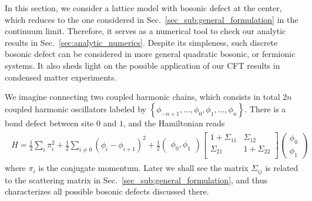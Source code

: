 In this section, we consider a lattice model with bosonic defect at the center, which reduces to the one considered in Sec.~\ref{sec_sub:general_formulation} in the continuum limit\cite{calabrese_entanglement_2012}. Therefore, it serves as a numerical tool to check our analytic results in Sec.~\ref{sec:analytic_numerics}. Despite its simpleness, such discrete bosonic defect can be considered in more general quadratic bosonic\cite{PhysRevA.74.022329}, or fermionic\cite{PhysRevB.64.064412} systems. It also sheds light on the possible application of our CFT results in condensed matter experiments\cite{Rohringer2015,Trotzky2012}.


We imagine connecting two coupled harmonic chains, which consists in total $2n$ coupled harmonic oscillators labeled by $\left\{\phi_{-n+1},...,\phi_0,\phi_1,...,\phi_n\right\}$. There is a bond defect between site $0$ and $1$, and the Hamiltonian reads
\begin{eqnarray}\begin{aligned}
H = \frac{1}{2} \sum_i \pi_i^2  +  \frac{1}{2} \sum_{i\ne 0 }  ( \phi_i - \phi_{i+1} )^2  +  \frac{1}{2} \begin{pmatrix}  \phi_0, \phi_1 \end{pmatrix}
\begin{bmatrix}
1 + \Sigma_{11}  & \Sigma_{12} \\
\Sigma_{21} &  1 + \Sigma_{22} \\
\end{bmatrix}
\begin{pmatrix}
\phi_0 \\
\phi_1 
\end{pmatrix}
\end{aligned}\end{eqnarray}
where $\pi_i$ is the conjugate momentum. Later we shall see the matrix $\Sigma_{ij}$ is related to the scattering matrix in Sec.~\ref{sec_sub:general_formulation}, and thus characterizes all possible bosonic defects discussed there.

